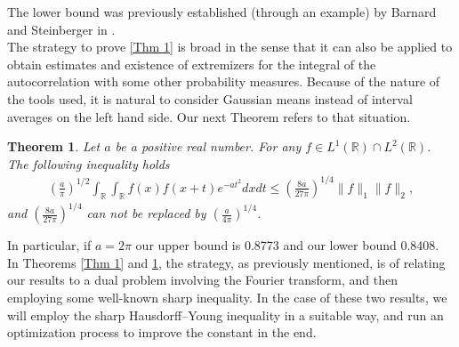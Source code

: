 \documentclass[11pt, reqno]{amsart}
\numberwithin{equation}{section}
\newtheorem{theorem}{Theorem}[section]
\newtheorem{corollary}[theorem]{Corollary}
\newcommand{\R}{{\mathbb R}}
\begin{document}

The lower bound was previously established (through an example) by Barnard and Steinberger in \cite{BarnardSteinerberger}.\\

The strategy to prove \ref{Thm 1} is broad in the sense that it can also be applied to obtain estimates and existence of extremizers for the integral of the autocorrelation
with some other probability measures. Because of the nature of the tools used, it is natural to consider Gaussian means instead of interval averages on the left hand side. Our next Theorem refers to that situation.

\begin{theorem}\label{Thm 3}
Let $a$ be a positive real number. For any $f\in L^{1}(\R)\cap L^{2}(\R)$. The following inequality holds
\begin{align*}
\left(\frac{a}{\pi}\right)^{1/2}\int_{\R}\int_{\R}f(x)f(x+t)e^{-a t^{2}}dxdt\leq \left(\frac{8a}{27\pi}\right)^{1/4}\|f\|_1\|f\|_2,
\end{align*}
and $\left(\frac{8a}{27\pi}\right)^{1/4}$ can not be replaced by $\left(\frac{a}{4\pi}\right)^{1/4}$. 
\end{theorem}
In particular, if $a=2\pi$ our upper bound is 0.8773 and our lower bound 0.8408.\\

In Theorems \ref{Thm 1} and \ref{Thm 3}, the strategy, as previously mentioned, is of relating our results to a dual problem involving the Fourier transform, and then employing some well-known sharp inequality. In the case of these two results, we will
employ the sharp Hausdorff--Young inequality in a suitable way, and run an optimization process to improve the constant in the end. \\
\end{document}
